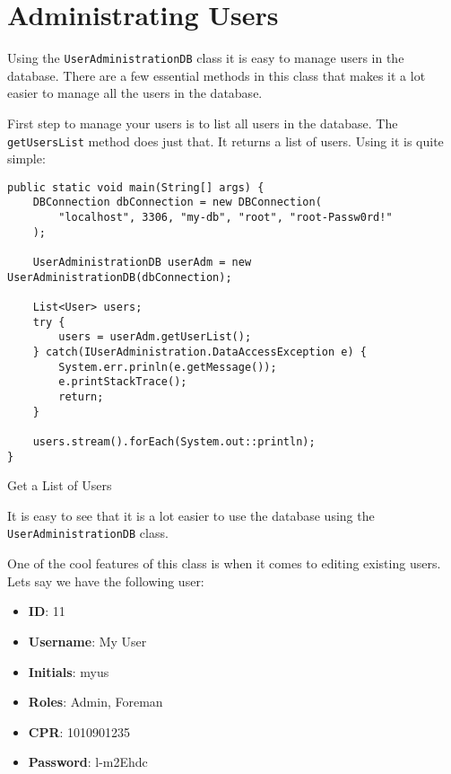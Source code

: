 \section{Administrating Users}

Using the \texttt{UserAdministrationDB} class it is easy to manage users in the database. There are a few essential methods in this class that makes it a lot easier to manage all the users in the database.

First step to manage your users is to list all users in the database. The \texttt{getUsersList} method does just that. It returns a list of users. Using it is quite simple:

\begin{listing}[ht]
\begin{verbatim}
public static void main(String[] args) {
    DBConnection dbConnection = new DBConnection(
        "localhost", 3306, "my-db", "root", "root-Passw0rd!"
    );
    
    UserAdministrationDB userAdm = new UserAdministrationDB(dbConnection);
    
    List<User> users;
    try {
        users = userAdm.getUserList();
    } catch(IUserAdministration.DataAccessException e) {
        System.err.prinln(e.getMessage());
        e.printStackTrace();
        return;
    }
    
    users.stream().forEach(System.out::println);
}
\end{verbatim}
\caption{Get a List of Users}
\label{listing:3}
\end{listing}

It is easy to see that it is a lot easier to use the database using the \texttt{UserAdministrationDB} class.

One of the cool features of this class is when it comes to editing existing users. Lets say we have the following user:

\begin{multicols}{2}
    \begin{itemize}
        \item \textbf{ID}: 11
        \item \textbf{Username}: My User
        \item \textbf{Initials}: myus
        \item \textbf{Roles}: Admin, Foreman
        \item \textbf{CPR}: 1010901235
        \item \textbf{Password}: l-m2Ehdc
        \
    \end{itemize}
\end{multicols}

